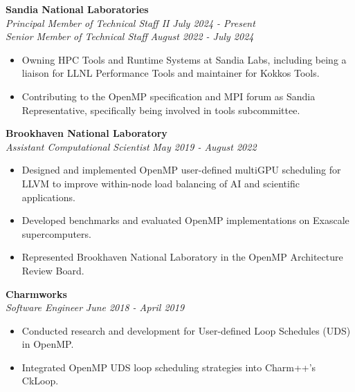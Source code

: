 \vspace{-0.2in}


\textbf{Sandia National Laboratories}\\
\textit{Principal Member of Technical Staff II} \hfill \textit{July 2024 - Present}\\
\textit{Senior Member of Technical Staff} \hfill \textit{August 2022 - July 2024}

\vspace{-0.2in}
\begin{itemize}
\item Owning HPC Tools and Runtime Systems at Sandia Labs, including being a liaison for LLNL Performance Tools and maintainer for Kokkos Tools. 
\item Contributing to the OpenMP specification and MPI forum as Sandia Representative, specifically being involved in tools subcommittee. 
\end{itemize} 
\vspace{-0.10in}
\textbf{Brookhaven National Laboratory}\\
\textit{Assistant Computational Scientist} \hfill \textit{May 2019 - August 2022}\\
\vspace*{-0.35in}
\begin{itemize}
   \item Designed and implemented OpenMP user-defined multiGPU scheduling for LLVM to improve within-node load balancing of AI and scientific applications. 
   \item Developed benchmarks and evaluated OpenMP implementations on Exascale supercomputers.
   \item Represented Brookhaven National Laboratory in the OpenMP Architecture Review Board. 
\end{itemize}
\vspace{-0.1in}
\textbf{Charmworks}\\
\textit{Software Engineer} \hfill \textit{June 2018 - April 2019}\\
\vspace{-0.35in}
\begin{itemize}
\item Conducted research and development for User-defined Loop Schedules (UDS) in OpenMP.
\item Integrated OpenMP UDS loop scheduling strategies into Charm++'s CkLoop. 
\end{itemize}
